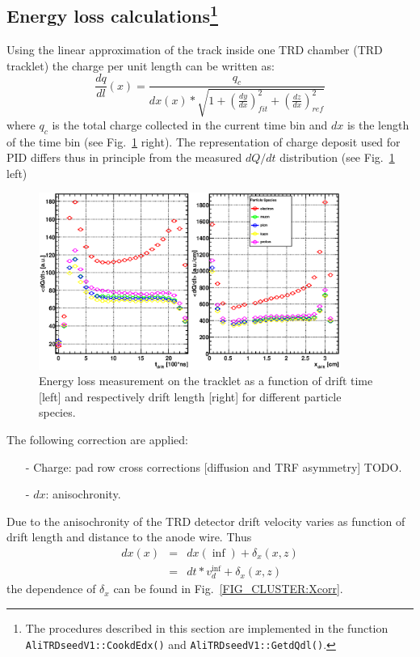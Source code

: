 \documentclass{alicetdr}
\begin{document}
\subsection[Tracklet dE/dx]{Energy loss calculations\footnote{The procedures 
described in this section are implemented in the function 
{\tt AliTRDseedV1::CookdEdx()} and 
{\tt AliTRDseedV1::GetdQdl()}.}}\label{REC:Tracking:TrackletdEdx}

Using the linear approximation of the track inside one TRD chamber (TRD tracklet) 
the charge per unit length can be written as:
\begin{equation}
\frac{dq}{dl}(x) = \frac{q_{c}}{dx(x) 
                 * \sqrt{1 + (\frac{dy}{dx})^{2}_{fit} + (\frac{dz}{dx})^{2}_{ref}}}
\end{equation}
where $q_c$ is the total charge collected in the current time bin and $dx$ is the length 
of the time bin (see Fig.~\ref{FIG_TRACKLET:dEdx} right). The representation of charge 
deposit used for PID differs thus in principle from the measured $dQ/dt$ distribution 
(see Fig.~\ref{FIG_TRACKLET:dEdx} left) 
\begin{figure}[htb]
\begin{center}
\includegraphics[width=0.88\textwidth, height=0.45\textwidth]{plots/trackletDQDT.eps}
\end{center}
\caption{
Energy loss measurement on the tracklet as a function of drift time [left] and 
respectively drift length [right] for different particle species.}
\label{FIG_TRACKLET:dEdx}
\end{figure} 
The following correction are applied:
\begin{itemize}
\item[-] Charge: pad row cross corrections [diffusion and TRF asymmetry] TODO.
\item[-] $dx$: anisochronity.
\end{itemize}
Due to the anisochronity of the TRD detector drift velocity varies as function of 
drift length and distance to the anode wire. Thus 
\begin{eqnarray}
dx(x) &=& dx(\inf) + \delta_x(x,z)\\ 
      &=& dt*v_d^{\inf} + \delta_x(x,z) 
\end{eqnarray}
the dependence of $\delta_x$ can be found in Fig.~\ref{FIG_CLUSTER:Xcorr}.
\end{document}
